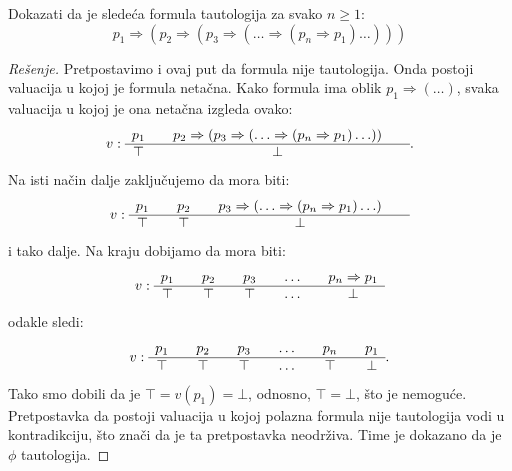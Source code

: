 \begin{EX}
  Dokazati da je slede\'ca formula tautologija za svako $n \ge 1$:
  $$
    p_1 \Rightarrow (p_2 \Rightarrow (p_3 \Rightarrow ( \ldots \Rightarrow (p_n \Rightarrow p_1) \ldots )))
  $$
\end{EX}
\begin{proof}[Re\v senje]
  Pretpostavimo i ovaj put da formula nije tautologija. Onda postoji valuacija u kojoj je formula neta\v cna.
  Kako formula ima oblik $p_1 \Rightarrow ( \ldots )$, svaka valuacija u kojoj je ona neta\v cna izgleda ovako:
  $$
    v: \begin{array}{c@{\qquad}c@{\qquad}c@{\qquad}c@{\qquad}c}
      p_1 & p_2 \Rightarrow (p_3 \Rightarrow ( \ldots \Rightarrow (p_n \Rightarrow p_1) \ldots ))\\
      \hline
      \top & \bot 
    \end{array}.
  $$
  Na isti na\v cin dalje zaklju\v cujemo da mora biti:
  $$
    v : \begin{array}{c@{\qquad}c@{\qquad}c@{\qquad}c@{\qquad}c}
      p_1 & p_2 & p_3 \Rightarrow ( \ldots \Rightarrow (p_n \Rightarrow p_1) \ldots )\\
      \hline
      \top & \top & \bot 
    \end{array}
  $$
  i tako dalje. Na kraju dobijamo da mora biti:
  $$
    v : \begin{array}{c@{\qquad}c@{\qquad}c@{\qquad}c@{\qquad}c}
      p_1 & p_2 & p_3 & \ldots & p_n \Rightarrow p_1\\
      \hline
      \top & \top & \top & \ldots & \bot 
    \end{array}
  $$
  odakle sledi:
  $$
    v : \begin{array}{c@{\qquad}c@{\qquad}c@{\qquad}c@{\qquad}c@{\qquad}c}
      p_1 & p_2 & p_3 & \ldots & p_n & p_1\\
      \hline
      \top & \top & \top & \ldots & \top & \bot 
    \end{array}.
  $$
  Tako smo dobili da je $\top = v(p_1) = \bot$, odnosno, $\top = \bot$, \v sto je nemogu\'ce.
  Pretpostavka da postoji valuacija u kojoj polazna formula nije tautologija vodi u kontradikciju,
  \v sto zna\v ci da je ta pretpostavka neodr\v ziva. Time je dokazano da je $\phi$ tautologija.
\end{proof}


